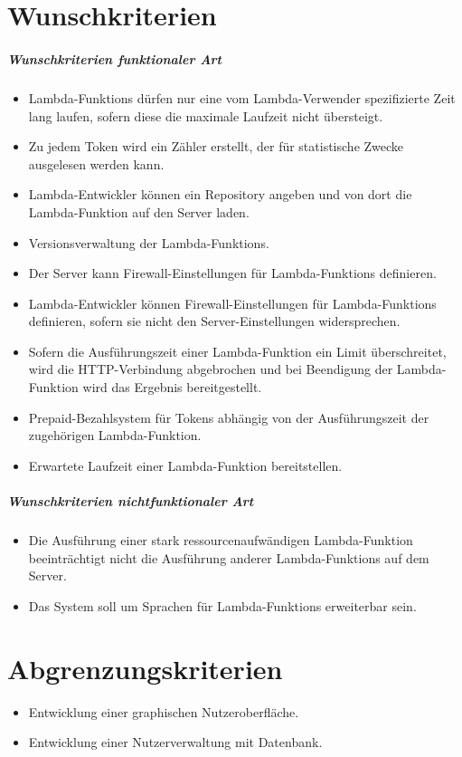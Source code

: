 \documentclass[a4paper,20pt,oneside]{book}
\begin{document}
\section{Wunschkriterien}
\subparagraph{Wunschkriterien funktionaler Art}
\begin{itemize}
\item \Glspl{Lambda-Funktion} dürfen nur eine vom \Gls{Lambda-Verwender} spezifizierte Zeit lang laufen, sofern diese die maximale Laufzeit nicht übersteigt.
\item Zu jedem \Gls{Token} wird ein Zähler erstellt, der für statistische Zwecke ausgelesen werden kann.
\item \Gls{Lambda-Entwickler} können ein \Gls{Repository} angeben und von dort die \gls{Lambda-Funktion} auf den \Gls{Server} laden.
\item Versionsverwaltung der \Glspl{Lambda-Funktion}.
\item Der \Gls{Server} kann Firewall-Einstellungen für \Glspl{Lambda-Funktion} definieren.
\item \Gls{Lambda-Entwickler} können Firewall-Einstellungen für \Glspl{Lambda-Funktion} definieren, sofern sie nicht den \Gls{Server}-Einstellungen widersprechen.
\item Sofern die Ausführungszeit einer \Gls{Lambda-Funktion} ein Limit überschreitet, wird die HTTP-Verbindung abgebrochen und bei Beendigung der \Gls{Lambda-Funktion} wird das Ergebnis bereitgestellt.
\item Prepaid-Bezahlsystem für \Glspl{Token} abhängig von der Ausführungszeit der zugehörigen \Gls{Lambda-Funktion}.
\item Erwartete Laufzeit einer  \Gls{Lambda-Funktion} bereitstellen.
\end{itemize}

\subparagraph{Wunschkriterien nichtfunktionaler Art}
\begin{itemize}
\item Die Ausführung einer stark ressourcenaufwändigen \Gls{Lambda-Funktion} beeinträchtigt nicht die Ausführung anderer \Glspl{Lambda-Funktion} auf dem \Gls{Server}.
\item Das System soll um Sprachen für \Glspl{Lambda-Funktion} erweiterbar sein.
\end{itemize}

\section{Abgrenzungskriterien}
\begin{itemize}
\item Entwicklung einer graphischen Nutzeroberfläche.
\item Entwicklung einer Nutzerverwaltung mit Datenbank.
\end{itemize}
\end{document}
